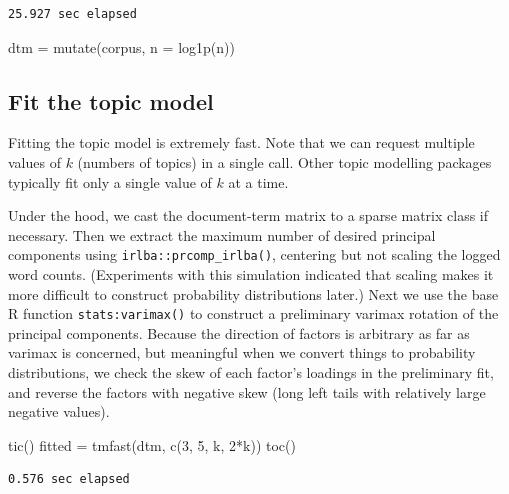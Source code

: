 \documentclass[
]{article}
\newenvironment{Shaded}{\begin{snugshade}}{\end{snugshade}}
\newcommand{\AttributeTok}[1]{\textcolor[rgb]{0.40,0.45,0.13}{#1}}
\newcommand{\DecValTok}[1]{\textcolor[rgb]{0.68,0.00,0.00}{#1}}
\newcommand{\FunctionTok}[1]{\textcolor[rgb]{0.28,0.35,0.67}{#1}}
\newcommand{\NormalTok}[1]{\textcolor[rgb]{0.00,0.23,0.31}{#1}}
\newcommand{\OtherTok}[1]{\textcolor[rgb]{0.00,0.23,0.31}{#1}}
\newcommand{\SpecialCharTok}[1]{\textcolor[rgb]{0.37,0.37,0.37}{#1}}
\begin{document}
\begin{verbatim}
25.927 sec elapsed
\end{verbatim}

\begin{Shaded}
\begin{Highlighting}[]
\NormalTok{dtm }\OtherTok{=} \FunctionTok{mutate}\NormalTok{(corpus, }\AttributeTok{n =} \FunctionTok{log1p}\NormalTok{(n))}
\end{Highlighting}
\end{Shaded}

\hypertarget{fit-the-topic-model}{%
\subsection{Fit the topic model}\label{fit-the-topic-model}}

Fitting the topic model is extremely fast. Note that we can request
multiple values of \(k\) (numbers of topics) in a single call. Other
topic modelling packages typically fit only a single value of \(k\) at a
time.

Under the hood, we cast the document-term matrix to a sparse matrix
class if necessary. Then we extract the maximum number of desired
principal components using \texttt{irlba::prcomp\_irlba()}, centering
but not scaling the logged word counts. (Experiments with this
simulation indicated that scaling makes it more difficult to construct
probability distributions later.) Next we use the base R function
\texttt{stats:varimax()} to construct a preliminary varimax rotation of
the principal components. Because the direction of factors is arbitrary
as far as varimax is concerned, but meaningful when we convert things to
probability distributions, we check the skew of each factor's loadings
in the preliminary fit, and reverse the factors with negative skew (long
left tails with relatively large negative values).

\begin{Shaded}
\begin{Highlighting}[]
\FunctionTok{tic}\NormalTok{()}
\NormalTok{fitted }\OtherTok{=} \FunctionTok{tmfast}\NormalTok{(dtm, }\FunctionTok{c}\NormalTok{(}\DecValTok{3}\NormalTok{, }\DecValTok{5}\NormalTok{, k, }\DecValTok{2}\SpecialCharTok{*}\NormalTok{k))}
\FunctionTok{toc}\NormalTok{()}
\end{Highlighting}
\end{Shaded}

\begin{verbatim}
0.576 sec elapsed
\end{verbatim}
\end{document}

